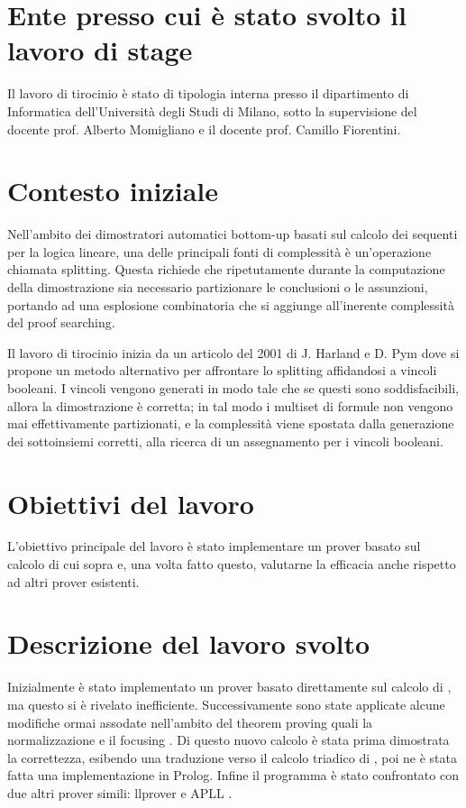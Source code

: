 \documentclass[a4paper, 12pt, italian]{article}
\begin{document}
\section{Ente presso cui è stato svolto il lavoro di stage}
Il lavoro di tirocinio è stato di tipologia interna presso il dipartimento di Informatica dell'Università degli Studi di Milano, sotto la supervisione del docente prof. Alberto Momigliano e il docente prof. Camillo Fiorentini.

\section{Contesto iniziale}
Nell'ambito dei dimostratori automatici bottom-up basati sul calcolo dei sequenti per la logica lineare, una delle principali fonti di complessità è un'operazione chiamata splitting.
Questa richiede che ripetutamente durante la computazione della dimostrazione sia necessario partizionare le conclusioni o le assunzioni, portando ad una esplosione combinatoria che si aggiunge all'inerente complessità del proof searching.

Il lavoro di tirocinio inizia da un articolo del 2001 di J. Harland e D. Pym \cite{HarlandPym} dove si propone un metodo alternativo per affrontare lo splitting affidandosi a vincoli booleani.
I vincoli vengono generati in modo tale che se questi sono soddisfacibili, allora la dimostrazione è corretta;
in tal modo i multiset di formule non vengono mai effettivamente partizionati, e la complessità viene spostata dalla generazione dei sottoinsiemi corretti, alla ricerca di un assegnamento per i vincoli booleani.

\section{Obiettivi del lavoro}
L'obiettivo principale del lavoro è stato implementare un prover basato sul calcolo di cui sopra e, una volta fatto questo, valutarne la efficacia anche rispetto ad altri prover esistenti.

\section{Descrizione del lavoro svolto}
Inizialmente è stato implementato un prover basato direttamente sul calcolo di \cite{HarlandPym}, ma questo si è rivelato inefficiente.
Successivamente sono state applicate alcune modifiche ormai assodate nell'ambito del theorem proving quali la normalizzazione e il focusing \cite{Focusing}.
Di questo nuovo calcolo è stata prima dimostrata la correttezza, esibendo una traduzione verso il calcolo triadico di \cite{Focusing}, poi ne è stata fatta una implementazione in Prolog.
Infine il programma è stato confrontato con due altri prover simili: llprover \cite{llprover} e APLL \cite{APLL}.
\end{document}
